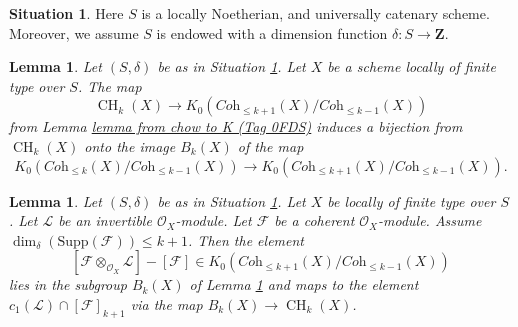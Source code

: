 \documentclass{amsart}
\theoremstyle{plain}
\newtheorem{lemma}[subsection]{Lemma}
\theoremstyle{definition}
\newtheorem{situation}[subsection]{Situation}
\theoremstyle{remark}
\numberwithin{equation}{subsection}
\def\CH{\mathop{\mathrm{CH}}\nolimits}
\begin{document}
\begin{situation}
\label{situation-setup}
Here $S$ is a locally Noetherian, and universally catenary scheme.
Moreover, we assume $S$ is endowed with a dimension function
$\delta : S \longrightarrow \mathbf{Z}$.
\end{situation}

\begin{lemma}
\label{lemma-cycles-rational-equivalence-K-group}
Let $(S, \delta)$ be as in Situation \ref{situation-setup}.
Let $X$ be a scheme locally of finite type over $S$.
The map
$$
\CH_k(X) \longrightarrow
K_0(\textit{Coh}_{\leq k + 1}(X)/\textit{Coh}_{\leq k - 1}(X))
$$
from Lemma \href{https://stacks.math.columbia.edu/tag/0FDS}{lemma from chow to K (Tag 0FDS)} induces a bijection from
$\CH_k(X)$ onto the image $B_k(X)$ of the map
$$
K_0(\textit{Coh}_{\leq k}(X)/\textit{Coh}_{\leq k - 1}(X))
\longrightarrow
K_0(\textit{Coh}_{\leq k + 1}(X)/\textit{Coh}_{\leq k - 1}(X)).
$$
\end{lemma}

\begin{lemma}
\label{lemma-coherent-sheaf-cap-c1}
Let $(S, \delta)$ be as in Situation \ref{situation-setup}.
Let $X$ be locally of finite type over $S$.
Let $\mathcal{L}$ be an invertible $\mathcal{O}_X$-module.
Let $\mathcal{F}$ be a coherent $\mathcal{O}_X$-module.
Assume $\dim_\delta(\text{Supp}(\mathcal{F})) \leq k + 1$.
Then the element
$$
[\mathcal{F} \otimes_{\mathcal{O}_X} \mathcal{L}]
-
[\mathcal{F}]
\in
K_0(\textit{Coh}_{\leq k + 1}(X)/\textit{Coh}_{\leq k - 1}(X))
$$
lies in the subgroup $B_k(X)$ of
Lemma \ref{lemma-cycles-rational-equivalence-K-group} and maps to
the element $c_1(\mathcal{L}) \cap [\mathcal{F}]_{k + 1}$ via
the map $B_k(X) \to \CH_k(X)$.
\end{lemma}
\end{document}
